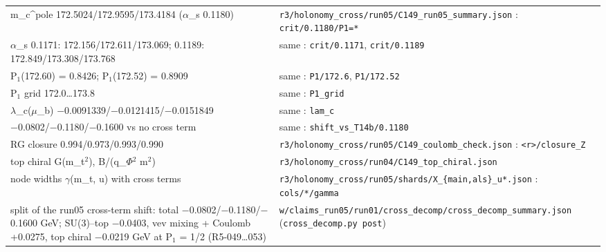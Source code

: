 {\begin{longtable}{@{}>{\raggedright\arraybackslash}p{}>{\raggedright\arraybackslash}p{}@{}}
m\_\allowbreak{}c\textasciicircum{}pole 172.5024/\allowbreak{}172.9595/\allowbreak{}173.4184 (\ensuremath{\alpha}\_\allowbreak{}s 0.1180) & \texttt{r3/\allowbreak{}holonomy\_\allowbreak{}cross/\allowbreak{}run05/\allowbreak{}C149\_\allowbreak{}run05\_\allowbreak{}summary.json} : \texttt{crit/\allowbreak{}0.1180/\allowbreak{}P1=*} \\
\ensuremath{\alpha}\_\allowbreak{}s 0.1171: 172.156/\allowbreak{}172.611/\allowbreak{}173.069; 0.1189: 172.849/\allowbreak{}173.308/\allowbreak{}173.768 & same : \texttt{crit/\allowbreak{}0.1171}, \texttt{crit/\allowbreak{}0.1189} \\
P\ensuremath{_1}(172.60) = 0.8426; P\ensuremath{_1}(172.52) = 0.8909 & same : \texttt{P1/\allowbreak{}172.6}, \texttt{P1/\allowbreak{}172.52} \\
P\ensuremath{_1} grid 172.0\ldots{}173.8 & same : \texttt{P1\_\allowbreak{}grid} \\
\ensuremath{\lambda}\_\allowbreak{}c(\ensuremath{\mu}\_\allowbreak{}b) \ensuremath{-}0.0091339/\allowbreak{}\ensuremath{-}0.0121415/\allowbreak{}\ensuremath{-}0.0151849 & same : \texttt{lam\_\allowbreak{}c} \\
\ensuremath{-}0.0802/\allowbreak{}\ensuremath{-}0.1180/\allowbreak{}\ensuremath{-}0.1600 vs no cross term & same : \texttt{shift\_\allowbreak{}vs\_\allowbreak{}T14b/\allowbreak{}0.1180} \\
RG closure 0.994/\allowbreak{}0.973/\allowbreak{}0.993/\allowbreak{}0.990 & \texttt{r3/\allowbreak{}holonomy\_\allowbreak{}cross/\allowbreak{}run05/\allowbreak{}C149\_\allowbreak{}coulomb\_\allowbreak{}check.json} : \texttt{<r>/\allowbreak{}closure\_\allowbreak{}Z} \\
top chiral G(m\_\allowbreak{}t\ensuremath{^2}), B/\allowbreak{}(q\_\allowbreak{}\ensuremath{\Phi}\ensuremath{^2} m\ensuremath{^2}) & \texttt{r3/\allowbreak{}holonomy\_\allowbreak{}cross/\allowbreak{}run04/\allowbreak{}C149\_\allowbreak{}top\_\allowbreak{}chiral.json} \\
node widths \ensuremath{\gamma}(m\_\allowbreak{}t, u) with cross terms & \texttt{r3/\allowbreak{}holonomy\_\allowbreak{}cross/\allowbreak{}run05/\allowbreak{}shards/\allowbreak{}X\_\allowbreak{}\{main,als\}\_\allowbreak{}u*.json} : \texttt{cols/\allowbreak{}*/\allowbreak{}gamma} \\
split of the run05 cross-term shift: total \ensuremath{-}0.0802/\allowbreak{}\ensuremath{-}0.1180/\allowbreak{}\ensuremath{-}0.1600 GeV; SU(3)--top \ensuremath{-}0.0403, vev mixing + Coulomb +0.0275, top chiral \ensuremath{-}0.0219 GeV at P\ensuremath{_1} = 1/\allowbreak{}2 (R5-049\ldots{}053) & \texttt{w/\allowbreak{}claims\_\allowbreak{}run05/\allowbreak{}run01/\allowbreak{}cross\_\allowbreak{}decomp/\allowbreak{}cross\_\allowbreak{}decomp\_\allowbreak{}summary.json} (\texttt{cross\_\allowbreak{}decomp.py post}) \\

\end{longtable}}
